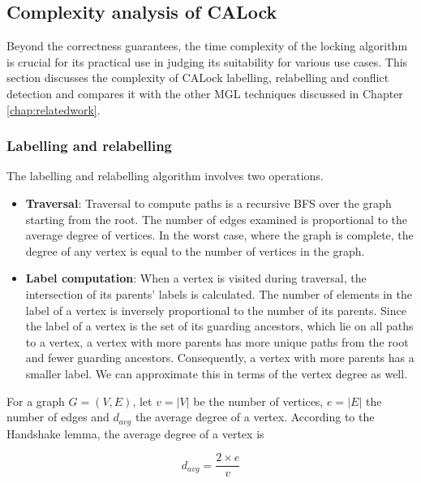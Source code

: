 \subsection{Complexity analysis of CALock} \label{complexityAnalysis}

Beyond the correctness guarantees, the time complexity of the locking algorithm is crucial for its practical use in judging its suitability for various use cases. This section discusses the complexity of CALock labelling, relabelling and conflict detection and compares it with the other MGL techniques discussed in Chapter \ref{chap:relatedwork}.

\subsubsection{Labelling and relabelling}
The labelling and relabelling algorithm involves two operations.
\begin{itemize}
	\item \textbf{Traversal}: Traversal to compute paths is a recursive BFS over the graph starting from the root. The number of edges examined is proportional to the average degree of vertices. In the worst case, where the graph is complete, the degree of any vertex is equal to the number of vertices in the graph. 
	
	\item \textbf{Label computation}: When a vertex is visited during traversal, the intersection of its parents' labels is calculated. The number of elements in the label of a vertex is inversely proportional to the number of its parents. Since the label of a vertex is the set of its guarding ancestors, which lie on all paths to a vertex, a vertex with more parents has more unique paths from the root and fewer guarding ancestors. Consequently, a vertex with more parents has a smaller label. We can approximate this in terms of the vertex degree as well. 
\end{itemize}

For a graph $G = (V, E)$, let $v = \lvert V \rvert$ be the number of vertices, $e = \lvert E \rvert$ the number of edges and $d_{avg}$ the average degree of a vertex. According to the Handshake lemma, the average degree of a vertex is 

\begin{equation}
	\mathit{d_{avg}} = \frac{2 \times e}{v} 
\end{equation}


